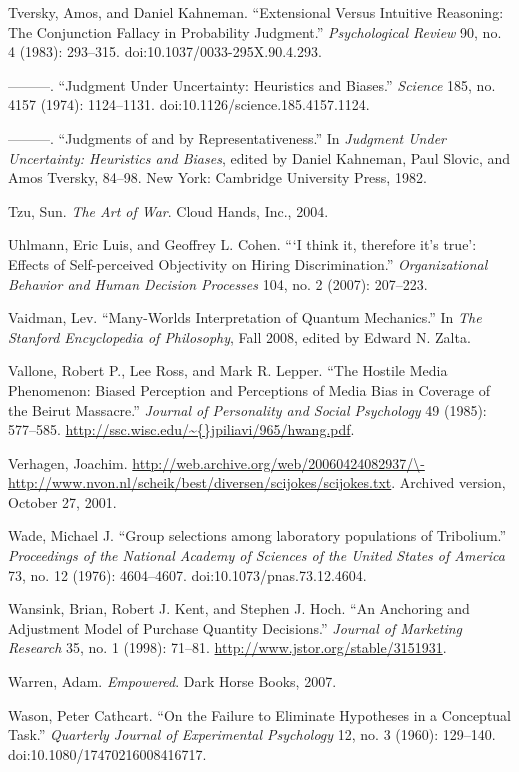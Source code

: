 \documentclass[letterpaper]{book}
\begin{document}
{
 Tversky, Amos, and Daniel Kahneman. ``Extensional
Versus Intuitive Reasoning: The Conjunction Fallacy in Probability
Judgment.'' \textit{Psychological Review} 90, no. 4
(1983): 293--315. doi:10.1037/0033-295X.90.4.293.}

{
 {}---{}---{}---. ``Judgment Under Uncertainty:
Heuristics and Biases.'' \textit{Science} 185, no.
4157 (1974): 1124--1131. doi:10.1126/science.185.4157.1124.}

{
 {}---{}---{}---. ``Judgments of and by
Representativeness.'' In \textit{Judgment Under
Uncertainty: Heuristics and Biases}, edited by Daniel Kahneman, Paul
Slovic, and Amos Tversky, 84--98. New York: Cambridge University Press,
1982.}

{
 Tzu, Sun. \textit{The Art of War}. Cloud Hands, Inc., 2004.}

{
 Uhlmann, Eric Luis, and Geoffrey L. Cohen.
```I think it, therefore
it's true': Effects of Self-perceived
Objectivity on Hiring Discrimination.''
\textit{Organizational Behavior and Human Decision Processes} 104, no.
2 (2007): 207--223.}

{
 Vaidman, Lev. ``Many-Worlds Interpretation of
Quantum Mechanics.'' In \textit{The Stanford
Encyclopedia of Philosophy}, Fall 2008, edited by Edward N. Zalta.}

{
 Vallone, Robert P., Lee Ross, and Mark R. Lepper.
``The Hostile Media Phenomenon: Biased Perception and
Perceptions of Media Bias in Coverage of the Beirut
Massacre.'' \textit{Journal of Personality and Social
Psychology} 49 (1985): 577--585.
\url{http://ssc.wisc.edu/\~{}jpiliavi/965/hwang.pdf}.}

{
 Verhagen, Joachim.
\url{http://web.archive.org/web/20060424082937/\-http://www.nvon.nl/scheik/best/diversen/scijokes/scijokes.txt}.
Archived version, October 27, 2001.}

{
 Wade, Michael J. ``Group selections among
laboratory populations of Tribolium.''
\textit{Proceedings of the National Academy of Sciences of the United
States of America} 73, no. 12 (1976): 4604--4607.
doi:10.1073/pnas.73.12.4604.}

{
 Wansink, Brian, Robert J. Kent, and Stephen J. Hoch.
``An Anchoring and Adjustment Model of Purchase
Quantity Decisions.'' \textit{Journal of Marketing
Research} 35, no. 1 (1998): 71--81.
\url{http://www.jstor.org/stable/3151931}.}

{
 Warren, Adam. \textit{Empowered}. Dark Horse Books, 2007.}

{
 Wason, Peter Cathcart. ``On the Failure to
Eliminate Hypotheses in a Conceptual Task.''
\textit{Quarterly Journal of Experimental Psychology} 12, no. 3 (1960):
129--140. doi:10.1080/17470216008416717.}
\end{document}
